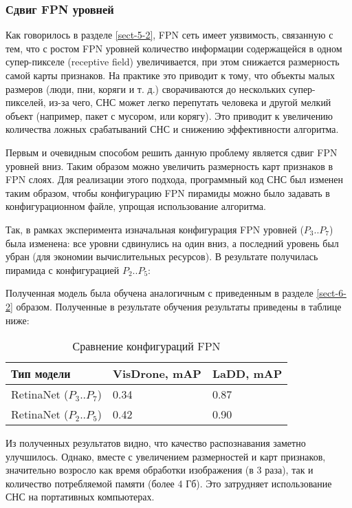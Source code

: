 \subsubsection{Сдвиг FPN уровней} \label{sect-6-3}

Как говорилось в разделе \ref{sect-5-2}, FPN сеть имеет уязвимость, связанную с тем, что с ростом FPN уровней количество информации содержащейся в одном супер-пикселе (receptive field) увеличивается, при этом снижается размерность самой карты признаков. На практике это приводит к тому, что объекты малых размеров (люди, пни, коряги и т. д.) сворачиваются до нескольких супер-пикселей, из-за чего, СНС может легко перепутать человека и другой мелкий объект (например, пакет с мусором, или корягу). Это приводит к увеличению количества ложных срабатываний СНС и снижению эффективности алгоритма.

Первым и очевидным способом решить данную проблему является сдвиг FPN уровней вниз. Таким образом можно увеличить размерность карт признаков в FPN слоях. Для реализации этого подхода, программный код СНС был изменен таким образом, чтобы конфигурацию FPN пирамиды можно было задавать в конфигурационном файле, упрощая использование алгоритма. 

Так, в рамках эксперимента изначальная конфигурация FPN уровней ($P_3..P_7$) была изменена: все уровни сдвинулись на один вниз, а последний уровень был убран (для экономии вычислительных ресурсов). В результате получилась пирамида с конфигурацией $P_2..P_5$:


Полученная модель была обучена аналогичным с приведенным в разделе \ref{sect-6-2} образом. Полученные в результате обучения результаты приведены в таблице ниже:

\begin{table}[H]
    \caption{Сравнение конфигураций FPN}\label{leaderboard-3}
    \begin{tabular}{|p{5cm}|p{5cm}|p{5cm}|}
        \hline
        {Тип модели} & {VisDrone, mAP} & {LaDD, mAP} \\
        \hline
        RetinaNet ($P_3..P_7$) & 0.34 & 0.87 \\
        \hline
        RetinaNet ($P_2..P_5$) & 0.42 & 0.90 \\
        \hline
    \end{tabular}
\end{table}

Из полученных результатов видно, что качество распознавания заметно улучшилось. Однако, вместе с увеличением размерностей и карт признаков, значительно возросло как время обработки изображения (в 3 раза), так и количество потребляемой памяти (более 4 Гб). Это затрудняет использование СНС на портативных компьютерах.